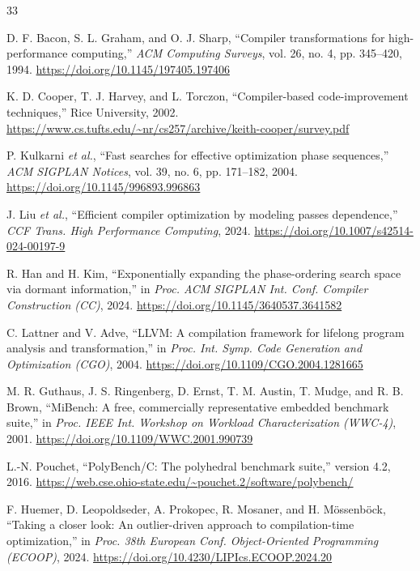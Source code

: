 \documentclass[conference]{IEEEtran}
\begin{document}
\begin{thebibliography}{33}

D. F. Bacon, S. L. Graham, and O. J. Sharp,
``Compiler transformations for high-performance computing,''
\textit{ACM Computing Surveys}, vol. 26, no. 4, pp. 345--420, 1994.
\url{https://doi.org/10.1145/197405.197406}

K. D. Cooper, T. J. Harvey, and L. Torczon,
``Compiler-based code-improvement techniques,'' Rice University, 2002.
\url{https://www.cs.tufts.edu/~nr/cs257/archive/keith-cooper/survey.pdf}

P. Kulkarni \textit{et al.},
``Fast searches for effective optimization phase sequences,''
\textit{ACM SIGPLAN Notices}, vol. 39, no. 6, pp. 171--182, 2004.
\url{https://doi.org/10.1145/996893.996863}

J. Liu \textit{et al.},
``Efficient compiler optimization by modeling passes dependence,''
\textit{CCF Trans. High Performance Computing}, 2024.
\url{https://doi.org/10.1007/s42514-024-00197-9}

R. Han and H. Kim,
``Exponentially expanding the phase-ordering search space via dormant information,''
in \textit{Proc. ACM SIGPLAN Int. Conf. Compiler Construction (CC)}, 2024.
\url{https://doi.org/10.1145/3640537.3641582}

C. Lattner and V. Adve,
``LLVM: A compilation framework for lifelong program analysis and transformation,''
in \textit{Proc. Int. Symp. Code Generation and Optimization (CGO)}, 2004.
\url{https://doi.org/10.1109/CGO.2004.1281665}

M. R. Guthaus, J. S. Ringenberg, D. Ernst, T. M. Austin, T. Mudge, and R. B. Brown,
``MiBench: A free, commercially representative embedded benchmark suite,''
in \textit{Proc. IEEE Int. Workshop on Workload Characterization (WWC-4)}, 2001.
\url{https://doi.org/10.1109/WWC.2001.990739}

L.-N. Pouchet,
``PolyBench/C: The polyhedral benchmark suite,'' version 4.2, 2016.
\url{https://web.cse.ohio-state.edu/~pouchet.2/software/polybench/}

F. Huemer, D. Leopoldseder, A. Prokopec, R. Mosaner, and H. M\"ossenb\"ock,
``Taking a closer look: An outlier-driven approach to compilation-time optimization,''
in \textit{Proc. 38th European Conf. Object-Oriented Programming (ECOOP)}, 2024.
\url{https://doi.org/10.4230/LIPIcs.ECOOP.2024.20}


\end{thebibliography}
\end{document}
